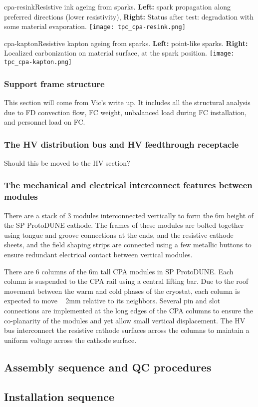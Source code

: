 \begin{cdrfigure}{cpa-resink}{Resistive ink ageing from sparks. 
 {\bf Left:} spark propagation along preferred directions (lower resistivity), {\bf Right:} Status after test: degradation with some material evaporation.} 
\texttt{[image: tpc\_cpa-resink.png]}
\end{cdrfigure}

\begin{cdrfigure}{cpa-kapton}{Resistive kapton ageing from sparks. 
 {\bf Left:} point-like sparks. {\bf Right:} Localized carbonization on material surface, at the spark position.}
\texttt{[image: tpc\_cpa-kapton.png]}
\end{cdrfigure}

\subsubsection{Support frame structure}

This section will come from Vic's write up.  It includes all the structural analysis due to FD convection flow, FC weight, unbalanced load during FC installation, and personnel load on FC.

\subsubsection{The HV distribution bus and HV feedthrough receptacle }

Should this be moved to the HV section?

\subsubsection{The mechanical and electrical interconnect features between modules}

There are a stack of 3 modules interconnected vertically to form the 6m height of the SP ProtoDUNE cathode.  The frames of these modules are bolted together using tongue and groove connections at the ends, and the resistive cathode sheets, and the field shaping strips are connected  using a few metallic buttons to ensure redundant electrical contact between vertical modules.

There are 6 columns of the 6m tall CPA modules in SP ProtoDUNE.  Each column is suspended to the CPA rail using a central lifting bar.  Due to the  roof movement between the warm and cold phases of the cryostat, each column is expected to move ~ 2mm relative to its neighbors.  Several pin and slot connections are implemented at the long edges of the CPA columns to ensure the co-planarity of the modules and yet allow small vertical displacement.  The HV bus interconnect the resistive cathode surfaces across the columns to maintain a uniform voltage across the cathode surface.


\subsection{Assembly sequence and QC procedures}

\subsection{Installation sequence}




